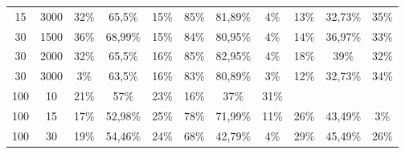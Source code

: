 \begin{table}[ht]
\begin{tabular}{cc|ccc|ccc|ccc}
        {15}                            & {3000}                    & {32\%}                              & {65,5\%}                            & {15\%}                              & {85\%}            & {81,89\%}                & {4\%}                        & {13\%}            & {32,73\%}                & {35\%}                       \\
        {30}                            & {1500}                    & {36\%}                              & {68,99\%}                           & {15\%}                              & {84\%}            & {80,95\%}                & {4\%}                        & {14\%}            & {36,97\%}                & {33\%}                       \\
        {30}                            & {2000}                    & {32\%}                              & {65,5\%}                            & {16\%}                              & {85\%}            & {82,95\%}                & {4\%}                        & {18\%}            & {39\%}                   & {32\%}                       \\
        {30}                            & {3000}                    & {3\%}                               & {63,5\%}                            & {16\%}                              & {83\%}            & {80,89\%}                & {3\%}                        & {12\%}            & {32,73\%}                & {34\%}                       \\
        {100}                           & {10}                      & {21\%}                              & {57\%}                              & {23\%}                              & {16\%}            & {37\%}                   & {31\%}                                                                                                     \\
        {100}                           & {15}                      & {17\%}                              & {52,98\%}                           & {25\%}                              & {78\%}            & {71,99\%}                & {11\%}                       & {26\%}            & {43,49\%}                & {3\%}                        \\
        {100}                           & {30}                      & {19\%}                              & {54,46\%}                           & {24\%}                              & {68\%}            & {42,79\%}                & {4\%}                        & {29\%}            & {45,49\%}                & {26\%}                       \\

\end{tabular}
\end{table}
